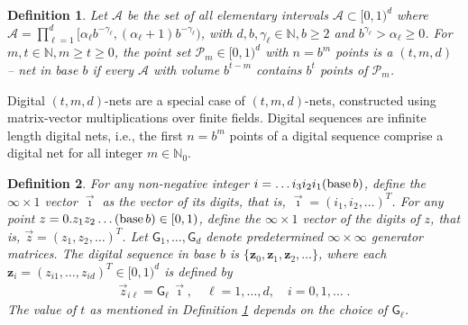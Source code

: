 \documentclass{svjour3}                     %
\newtheorem{defn}{Definition}
\newcommand{\bm}[1]{\boldsymbol{#1}}
\newcommand{\naturals}{\mathbb{N}}
\newcommand{\vz}{\bm{z}}
\newcommand{\JRNote}[1]{{\textcolor{green}{JR: #1}}}
\begin{document}
\begin{defn}
	\label{defn:tmd_net}
	Let $\mathcal{A}$ be the set of all elementary intervals $\mathcal{A} \subset [0, 1)^d$ where
	$\mathcal{A} = \prod_{\ell=1}^d [\alpha_\ell b^{-\gamma_\ell} , (\alpha_\ell + 1) b^{-\gamma_\ell})$, 
	with $d,b,\gamma_\ell \in \naturals, b \ge 2$ 
	and $b^{\gamma_\ell}
	> \alpha_\ell \ge 0$. For $m,t \in \naturals, m \ge t \ge 0$, the point set $\mathcal{P}_m \in [0, 1)^d$ with $n = b^m$ points is a $(t, m, d)$ -- net in base $b$ if every $\mathcal{A}$ with volume $b^{t-m}$ contains $b^t$ points of $\mathcal{P}_m$.
\end{defn}

Digital $(t,m, d)$-nets are a special case of $(t,m, d)$-nets, constructed using matrix-vector multiplications over finite fields. Digital sequences are infinite length digital nets, i.e., the first $n=b^m$ points of a digital sequence comprise a digital net for all integer $m \in \naturals_0$.


\begin{defn}
	For any non-negative integer $i = \dots i_3 i_2 i_1(\textup{base} \, b)$, define the $\infty \times 1$ vector $\vec{\imath}$ as the vector of its digits, that is, $\vec{\imath} = (i_1, i_2, \dots)^T$. 
	For any point $z = 0.z_1 z_2 \dots (\textup{base}\, b) \in [0, 1)$, define the $\infty \times 1$ vector of the digits of $z$, that is, $\vec{z} = (z_1, z_2, \dots)^T$. 
	Let $ \mathsf{G}_1, \dots , \mathsf{G}_d$ denote predetermined $\infty \times \infty$ generator matrices. 
	The digital sequence in \textup{base} $b$ is $\{\vz_0, \vz_1, \vz_2, \dots\}$, where each $\vz_i = ( z_{i1}, \dots , z_{id})^T \in [0, 1)^d$ is defined by
	\begin{align*}
	\vec{z}_{i\ell} = \mathsf{G}_{\ell} \, \vec{\imath}, \quad \ell = 1, \dots, d, \quad i = 0, 1, \dots \;.
	\end{align*}
	The value of $t$ as mentioned in Definition \ref{defn:tmd_net} depends on the choice of $\mathsf{G}_{\ell}$.
\end{defn}
\end{document}
